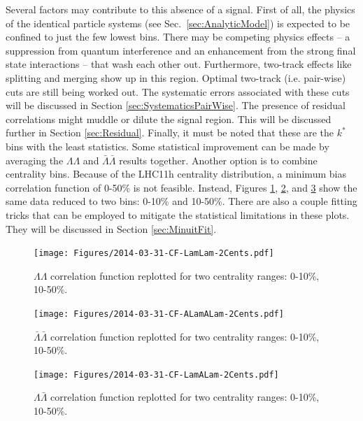 Several factors may contribute to this absence of a signal.  First of all, the physics of the identical particle systems (see Sec.\ \ref{sec:AnalyticModel}) is expected to be confined to just the few lowest bins.  There may be competing physics effects -- a suppression from quantum interference and an enhancement from the strong final state interactions -- that wash each other out.    Furthermore, two-track effects like splitting and merging show up in this region.  Optimal two-track (i.e. pair-wise) cuts are still being worked out.  The systematic errors associated with these cuts will be discussed in Section \ref{sec:SystematicsPairWise}.  The presence of residual correlations might muddle or dilute the signal region.  This will be discussed further in Section \ref{sec:Residual}.  Finally, it must be noted that these are the $k^*$ bins with the least statistics.  Some statistical improvement can be made by averaging the $\Lambda\Lambda$ and $\bar{\Lambda}\bar{\Lambda}$ results together.  Another option is to combine centrality bins.  Because of the LHC11h centrality distribution, a minimum bias correlation function of 0-50\% is not feasible.  Instead, Figures \ref{fig:CFLamLam2Cents}, \ref{fig:CFALamALam2Cents}, and \ref{fig:CFLamALam2Cents} show the same data reduced to two bins: 0-10\% and 10-50\%.  There are also a couple fitting tricks that can be employed to mitigate the statistical limitations in these plots.  They will be discussed in Section \ref{sec:MinuitFit}.

\begin{figure}[hbtp]
\texttt{[image: Figures/2014-03-31-CF-LamLam-2Cents.pdf]}
\caption[$\Lambda\Lambda$ correlation function for two centrality ranges]{$\Lambda\Lambda$ correlation function replotted for two centrality ranges: 0-10\%, 10-50\%.}
\label{fig:CFLamLam2Cents}
\end{figure}

\begin{figure}[hbtp]
\texttt{[image: Figures/2014-03-31-CF-ALamALam-2Cents.pdf]}
\caption[$\bar{\Lambda}\bar{\Lambda}$ correlation function for two centrality ranges]{$\bar{\Lambda}\bar{\Lambda}$ correlation function replotted for two centrality ranges: 0-10\%, 10-50\%.}
\label{fig:CFALamALam2Cents}
\end{figure}

\begin{figure}[hbtp]
\texttt{[image: Figures/2014-03-31-CF-LamALam-2Cents.pdf]}
\caption[$\Lambda\bar{\Lambda}$ correlation function for two centrality ranges]{$\Lambda\bar{\Lambda}$ correlation function replotted for two centrality ranges: 0-10\%, 10-50\%.}
\label{fig:CFLamALam2Cents}
\end{figure}


